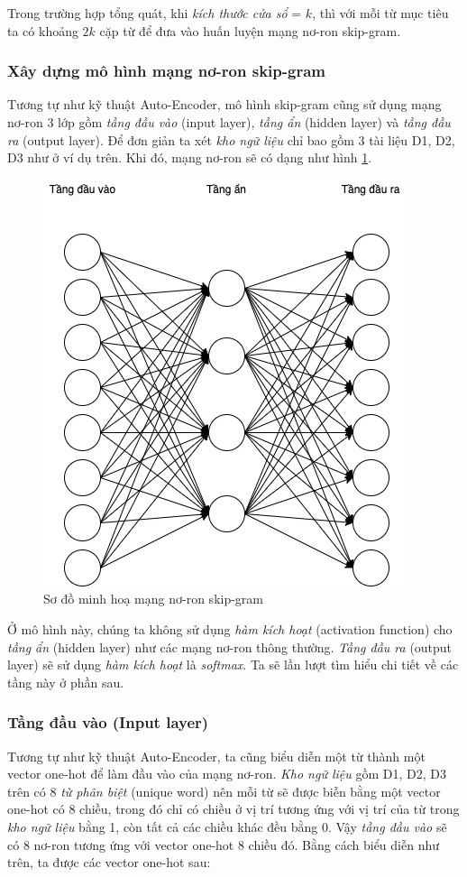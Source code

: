 Trong trường hợp tổng quát, khi \textit{kích thước cửa sổ} = $k$, thì với mỗi từ mục tiêu ta có khoảng $2k$ cặp từ để đưa vào huấn luyện mạng nơ-ron skip-gram.

\subsubsection{Xây dựng mô hình mạng nơ-ron skip-gram}
Tương tự như kỹ thuật Auto-Encoder, mô hình skip-gram cũng sử dụng mạng nơ-ron 3 lớp gồm \textit{tầng đầu vào} (input layer), \textit{tầng ẩn} (hidden layer) và \textit{tầng đầu ra} (output layer). Để đơn giản ta xét \textit{kho ngữ liệu} chỉ bao gồm 3 tài liệu D1, D2, D3 như ở ví dụ trên. Khi đó, mạng nơ-ron sẽ có dạng như hình \ref{fig:skip_gram}.

\begin{figure}[!h]
	\centering
		\includegraphics[width=0.5\columnwidth]{chapter04/figure/skip-gram-architecture.jpg}
        \caption{Sơ đồ minh hoạ mạng nơ-ron skip-gram}
        \label{fig:skip_gram}
\end{figure}

Ở mô hình này, chúng ta không sử dụng \textit{hàm kích hoạt} (activation function) cho \textit{tầng ẩn} (hidden layer) như các mạng nơ-ron thông thường. \textit{Tầng đầu ra} (output layer) sẽ sử dụng \textit{hàm kích hoạt} là \textit{softmax}. Ta sẽ lần lượt tìm hiểu chi tiết về các tầng này ở phần sau.

\subsubsection{Tầng đầu vào (Input layer)}
Tương tự như kỹ thuật Auto-Encoder, ta cũng biểu diễn một từ thành một vector one-hot để làm đầu vào của mạng nơ-ron. \textit{Kho ngữ liệu} gồm D1, D2, D3 trên có 8 \textit{từ phân biệt} (unique word) nên mỗi từ sẽ được biễn bằng một vector one-hot có 8 chiều, trong đó chỉ có chiều ở vị trí tương ứng với vị trí của từ trong \textit{kho ngữ liệu} bằng 1, còn tất cả các chiều khác đều bằng 0. Vậy \textit{tầng đầu vào} sẽ có 8 nơ-ron tương ứng với vector one-hot 8 chiều đó. Bằng cách biểu diễn như trên, ta được các vector one-hot sau:

